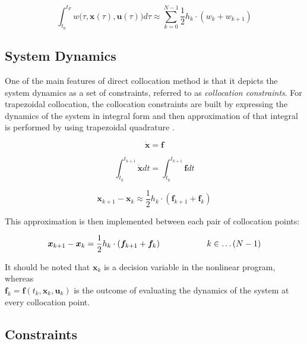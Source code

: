 \documentclass{thesisreport}
\begin{document}
 \begin{equation}
 \int_{t_0}^{t_F} w \big( \tau,\bm{x}(\tau),\bm{u}(\tau)\big)d \tau \approx \sum\limits_{k=0}^{N-1} \frac{1}{2} h_k \cdot (w_k + w_{k+1})
 \end{equation}
 
 \newpage
 
\subsection{System Dynamics}

One of the main features of direct collocation method is that it depicts the system dynamics as a set of constraints, referred to as \textit{collocation constraints}. For trapezoidal collocation, the collocation constraints are built by expressing the dynamics of the system in integral form and then approximation of that integral is performed by using trapezoidal quadrature \cite{Betts2010}. 

\begin{equation*}
\dot{\bm{x}}= \bm{f}
\end{equation*}
 
 \begin{equation*}
\int_{t_k}^{t_{k+1}} \dot{\bm{x}}dt = \int_{t_k}^{t_{k+1}} \bm{f}dt
\end{equation*}
 
  \begin{equation*}
\bm{x}_{k+1}-\bm{x}_k \approx \frac{1}{2} h_k \cdot (\bm{f}_{k+1} + \bm{f}_k )
\end{equation*}
 
 This approximation is then implemented between each pair of collocation points: 
 
 \begin{equation}\label{system_dynamics_equation}
 \bm{x}_{k+1} - \bm{x}_k = \frac{1}{2} h_k \cdot (\bm{f}_{k+1} + \bm{f}_k ) \text{\hspace{2cm}}  k \in \ldots(N-1)
 \end{equation}
 
 \noindent It should be noted that $\bm{x}_k$ is a decision variable in the nonlinear program, whereas \\ $\bm{f}_k = \bm{f}(t_k, \bm{x}_k, \bm{u}_k)$ is the outcome of evaluating the dynamics of the system at every collocation point.
 

\subsection{Constraints} 
 
\end{document}
